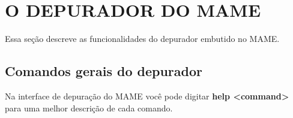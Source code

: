 \documentclass[letterpaper,10pt,brazil]{sphinxmanual}
\begin{document}
\chapter{O DEPURADOR DO MAME}
\label{debugger/index::doc}\label{debugger/index:o-depurador-do-mame}
Essa seção descreve as funcionalidades do depurador embutido no MAME.


\section{Comandos gerais do depurador}
\label{debugger/general:debugger-general-list}\label{debugger/general::doc}\label{debugger/general:comandos-gerais-do-depurador}
Na interface de depuração do MAME você pode digitar \textbf{help \textless{}command\textgreater{}}
para uma melhor descrição de cada comando.
\end{document}
